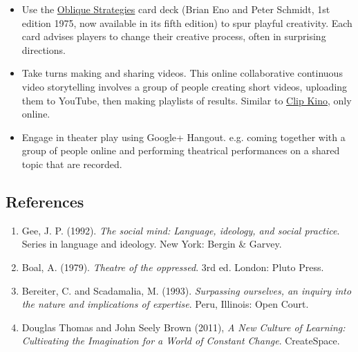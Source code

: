 \begin{itemize}
\item
  Use the \href{http://www.rtqe.net/ObliqueStrategies/}{Oblique
  Strategies} card deck (Brian Eno and Peter Schmidt, 1st edition 1975,
  now available in its fifth edition) to spur playful creativity. Each
  card advises players to change their creative process, often in
  surprising directions.
\item
  Take turns making and sharing videos. This online collaborative
  continuous video storytelling involves a group of people creating
  short videos, uploading them to YouTube, then making playlists of
  results. Similar to \href{http://clipkino.info/}{Clip Kino}, only
  online.
\item
  Engage in theater play using Google+ Hangout. e.g. coming together
  with a group of people online and performing theatrical performances
  on a shared topic that are recorded.
\end{itemize}
\subsection{References}

\begin{enumerate}
\item
  Gee, J. P. (1992). \emph{The social mind: Language, ideology, and
  social practice}. Series in language and ideology. New York: Bergin \&
  Garvey.
\item
  Boal, A. (1979). \emph{Theatre of the oppressed}. 3rd ed. London:
  Pluto Press.
\item
  Bereiter, C. and Scadamalia, M. (1993). \emph{Surpassing ourselves, an
  inquiry into the nature and implications of expertise}. Peru,
  Illinois: Open Court.
\item
  Douglas Thomas and John Seely Brown (2011), \emph{A New Culture of
  Learning: Cultivating the Imagination for a World of Constant Change}.
  CreateSpace.
\end{enumerate}
